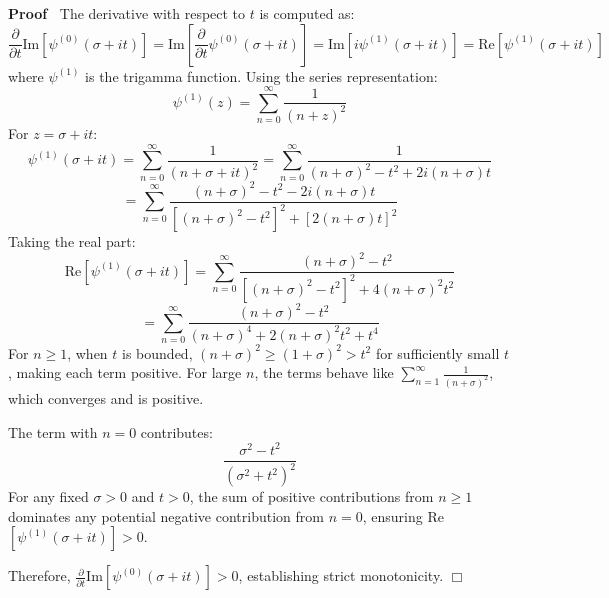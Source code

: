 \documentclass{article}
\newenvironment{proof}{\noindent\textbf{Proof\ }}{\hspace*{\fill}$\Box$\medskip}
\begin{document}
\begin{proof}
  The derivative with respect to $t$ is computed as:
  \begin{equation}
    \frac{\partial}{\partial t}  \text{Im} [\psi^{(0)} (\sigma + it)] =
    \text{Im} \left[ \frac{\partial}{\partial t} \psi^{(0)} (\sigma + it)
    \right] = \text{Im} [i \psi^{(1)} (\sigma + it)] = \text{Re} [\psi^{(1)}
    (\sigma + it)]
  \end{equation}
  where $\psi^{(1)}$ is the trigamma function. Using the series
  representation:
  \begin{equation}
    \psi^{(1)} (z) = \sum_{n = 0}^{\infty} \frac{1}{(n + z)^2}
  \end{equation}
  For $z = \sigma + it$:
  \begin{equation}
    \psi^{(1)}  (\sigma + it) = \sum_{n = 0}^{\infty} \frac{1}{(n + \sigma +
    it)^2} = \sum_{n = 0}^{\infty} \frac{1}{(n + \sigma)^2 - t^2 + 2 i (n +
    \sigma) t}
  \end{equation}
  \begin{equation}
    = \sum_{n = 0}^{\infty} \frac{(n + \sigma)^2 - t^2 - 2 i (n + \sigma)
    t}{[(n + \sigma)^2 - t^2]^2 + [2 (n + \sigma) t]^2}
  \end{equation}
  Taking the real part:
  \begin{equation}
    \text{Re} [\psi^{(1)} (\sigma + it)] = \sum_{n = 0}^{\infty} \frac{(n +
    \sigma)^2 - t^2}{[(n + \sigma)^2 - t^2]^2 + 4 (n + \sigma)^2 t^2}
  \end{equation}
  \begin{equation}
    = \sum_{n = 0}^{\infty} \frac{(n + \sigma)^2 - t^2}{(n + \sigma)^4 + 2 (n
    + \sigma)^2 t^2 + t^4}
  \end{equation}
  For $n \geq 1$, when $t$ is bounded, $(n + \sigma)^2 \geq (1 + \sigma)^2 >
  t^2$ for sufficiently small $t$, making each term positive. For large $n$,
  the terms behave like $\sum_{n = 1}^{\infty} \frac{1}{(n + \sigma)^2}$,
  which converges and is positive.
  
  The term with $n = 0$ contributes:
  \begin{equation}
    \frac{\sigma^2 - t^2}{(\sigma^2 + t^2)^2}
  \end{equation}
  For any fixed $\sigma > 0$ and $t > 0$, the sum of positive contributions
  from $n \geq 1$ dominates any potential negative contribution from $n = 0$,
  ensuring Re$[\psi^{(1)} (\sigma + it)] > 0$.
  
  Therefore, $\frac{\partial}{\partial t}  \text{Im} [\psi^{(0)} (\sigma +
  it)] > 0$, establishing strict monotonicity.
\end{proof}
\end{document}
